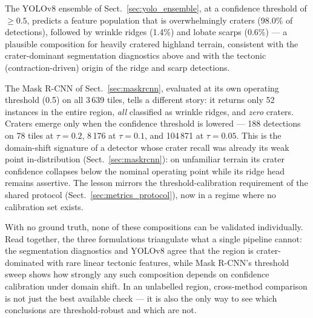 The YOLOv8 ensemble of Sect.~\ref{sec:yolo_ensemble}, at a confidence threshold of $\geq 0.5$, predicts a feature population that is overwhelmingly craters (98.0\% of detections), followed by wrinkle ridges (1.4\%) and lobate scarps (0.6\%) --- a plausible composition for heavily cratered highland terrain, consistent with the crater-dominant segmentation diagnostics above and with the tectonic (contraction-driven) origin of the ridge and scarp detections.

The Mask R-CNN of Sect.~\ref{sec:maskrcnn}, evaluated at its own operating threshold (0.5) on all 3\,639 tiles, tells a different story: it returns only 52 instances in the entire region, \emph{all} classified as wrinkle ridges, and \emph{zero} craters. Craters emerge only when the confidence threshold is lowered --- 188 detections on 78 tiles at $\tau = 0.2$, 8\,176 at $\tau = 0.1$, and 104\,871 at $\tau = 0.05$. This is the domain-shift signature of a detector whose crater recall was already its weak point in-distribution (Sect.~\ref{sec:maskrcnn}): on unfamiliar terrain its crater confidence collapses below the nominal operating point while its ridge head remains assertive. The lesson mirrors the threshold-calibration requirement of the shared protocol (Sect.~\ref{sec:metrics_protocol}), now in a regime where no calibration set exists.

With no ground truth, none of these compositions can be validated individually. Read together, the three formulations triangulate what a single pipeline cannot: the segmentation diagnostics and YOLOv8 agree that the region is crater-dominated with rare linear tectonic features, while Mask R-CNN's threshold sweep shows how strongly any such composition depends on confidence calibration under domain shift. In an unlabelled region, cross-method comparison is not just the best available check --- it is also the only way to see which conclusions are threshold-robust and which are not.
